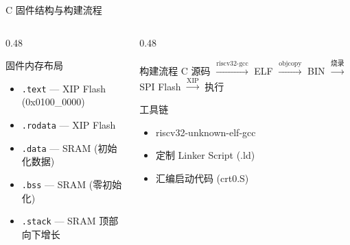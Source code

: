 \documentclass[aspectratio=169, 10pt, UTF8]{ctexbeamer}
\begin{document}
\begin{frame}{C 固件结构与构建流程}
  \begin{columns}[T]
    \begin{column}{0.48\textwidth}
      \begin{block}{固件内存布局}
        \begin{itemize}
          \item \texttt{.text}  — XIP Flash (0x0100\_0000)
          \item \texttt{.rodata} — XIP Flash
          \item \texttt{.data}   — SRAM (初始化数据)
          \item \texttt{.bss}    — SRAM (零初始化)
          \item \texttt{.stack}  — SRAM 顶部向下增长
        \end{itemize}
      \end{block}
    \end{column}
    \begin{column}{0.48\textwidth}
      \begin{exampleblock}{构建流程}
        C 源码 $\xrightarrow{\text{riscv32-gcc}}$ ELF $\xrightarrow{\text{objcopy}}$ BIN
        $\xrightarrow{\text{烧录}}$ SPI Flash $\xrightarrow{\text{XIP}}$ 执行
      \end{exampleblock}

      \begin{block}{工具链}
        \begin{itemize}
          \item riscv32-unknown-elf-gcc
          \item 定制 Linker Script (.ld)
          \item 汇编启动代码 (crt0.S)
        \end{itemize}
      \end{block}
    \end{column}
  \end{columns}
\end{frame}
\end{document}
